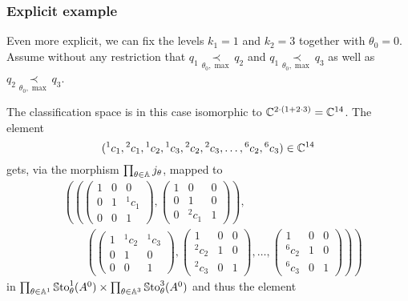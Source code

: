 \subsubsection{Explicit example}
\def\kOne{1}
\def\kTwo{3}
\def\zkOnepzKtwo{14} %
\def\zkOne{2} %
\def\zkTwo{6} %

Even more explicit, we can fix the levels $k_1=\kOne$ and $k_2=\kTwo$ together
with $\theta_0=0$.
Assume without any restriction that $q_1 \underset{\theta_0,\max}{\prec} q_2$
and $q_1 \underset{\theta_0,\max}{\prec} q_3$ as well as
$q_2 \underset{\theta_0,\max}{\prec} q_3$.

The classification space is in this case isomorphic to
$\C^{2\cdot(\kOne+2\cdot\kTwo)}=\C^{\zkOnepzKtwo}$.
The element
\[
  ({}^1c_1,{}^2c_1,
  {}^1c_2,{}^1c_3,{}^2c_2,{}^2c_3,\dots,{}^{\zkTwo}c_2,{}^{\zkTwo}c_3)
  \in\C^{\zkOnepzKtwo}
\]
gets, via the morphism $\prod_{\theta\in\mathbb{A}}j_\theta$, mapped to
\begin{align*}
  &\left(
  \left(
    \begin{pmatrix} 1 & 0 & 0 \\0 & 1 & {}^1c_1 \\0 & 0 & 1 \end{pmatrix},
    \begin{pmatrix} 1 & 0 & 0 \\0 & 1 & 0 \\0 & {}^2c_1 & 1 \end{pmatrix}
  \right),
  \right.
\\&\qquad\left(
  \left.
    \begin{pmatrix} 1 & {}^1c_2 & {}^1c_3 \\0 & 1 & 0 \\0 & 0 & 1 \end{pmatrix},
    \begin{pmatrix} 1 & 0 & 0 \\{}^2c_2 & 1 & 0 \\{}^2c_3 & 0 & 1 \end{pmatrix},
    \dots,
    \begin{pmatrix} 1 & 0 & 0 \\{}^{\zkTwo}c_2 & 1 & 0 \\{}^{\zkTwo}c_3 & 0 & 1 \end{pmatrix}
  \right)
  \right)
\end{align*}
in $\prod_{\theta\in\A^{\kOne}}\SSto_{\theta}^{\kOne}(A^0) \times
\prod_{\theta\in\A^{\kTwo}}\SSto_{\theta}^{\kTwo}(A^0)$ and thus the element
